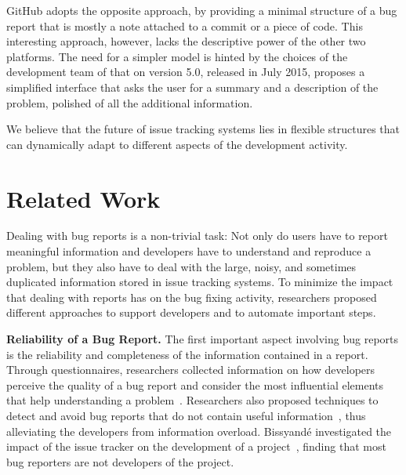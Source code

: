 GitHub adopts the opposite approach, by providing a minimal structure of a bug report that is mostly a note attached to a commit or a piece of code. This interesting approach, however, lacks the descriptive power of the other two platforms. The need for a simpler model is hinted by the choices of the development team of \bzilla that on version 5.0, released in July 2015, proposes a simplified interface that asks the user for a summary and a description of the problem, polished of all the additional information. 

We believe that the future of issue tracking systems lies in flexible structures that can dynamically adapt to different aspects of the development activity.

\section{Related Work} \label{sec:related}

Dealing with bug reports is a non-trivial task: Not only do users have to report meaningful information and developers have to understand and reproduce a problem, but they also have to deal with the large, noisy, and sometimes duplicated  information stored in issue tracking systems. To minimize the impact that dealing with reports has on the bug fixing activity, researchers proposed different approaches to support developers and to automate important steps.

\textbf{Reliability of a Bug Report.} The first important aspect involving bug reports is the reliability and completeness of the information contained in a report. Through questionnaires, researchers collected information on how developers perceive the quality of a bug report and consider the most influential elements that help understanding a problem~\cite{Zimm2010,Bett2007,Schr2010}. Researchers also proposed techniques to detect and avoid bug reports that do not contain useful information~\cite{Sun2011}, thus alleviating the developers from information overload. Bissyand\'e \etal investigated the impact of the issue tracker on the development of a project~\cite{Biss2013}, finding that most bug reporters are not developers of the project.

